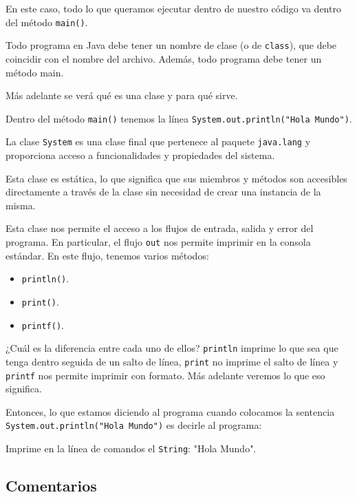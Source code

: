 \documentclass[12pt]{article}
\theoremstyle{largebreak}
\begin{document}
    En este caso, todo lo que queramos ejecutar dentro de nuestro código va dentro del método \lstinline|main()|.

    Todo programa en Java debe tener un nombre de clase (o de \lstinline|class|), que debe coincidir con el nombre del archivo. Además, todo programa debe tener un método main.

    \begin{obs}
        Más adelante se verá qué es una clase y para qué sirve.
    \end{obs}

    Dentro del método \lstinline|main()| tenemos la línea \lstinline|System.out.println("Hola Mundo")|.

    \begin{mydef}
        La clase \lstinline|System| es una clase final que pertenece al paquete \lstinline|java.lang| y proporciona acceso a funcionalidades y propiedades del sistema.
    \end{mydef}

    Esta clase es estática, lo que significa que sus miembros y métodos son accesibles directamente a través de la clase sin necesidad de crear una instancia de la misma.
    
    Esta clase nos permite el acceso a los flujos de entrada, salida y error del programa. En particular, el flujo \lstinline|out| nos permite imprimir en la consola estándar. En este flujo, tenemos varios métodos:
    \begin{itemize}
        \item \lstinline|println()|.
        \item \lstinline|print()|.
        \item \lstinline|printf()|.
    \end{itemize}
    ¿Cuál es la diferencia entre cada uno de ellos? \lstinline|println| imprime lo que sea que tenga dentro seguida de un salto de línea, \lstinline|print| no imprime el salto de línea y \lstinline|printf| nos permite imprimir con formato. Más adelante veremos lo que eso significa.
    
    Entonces, lo que estamos diciendo al programa cuando colocamos la sentencia \lstinline|System.out.println("Hola Mundo")| es decirle al programa:
    \begin{center}
        Imprime en la línea de comandos el \lstinline|String|: "Hola Mundo".
    \end{center}

    \subsection{Comentarios}
\end{document}
